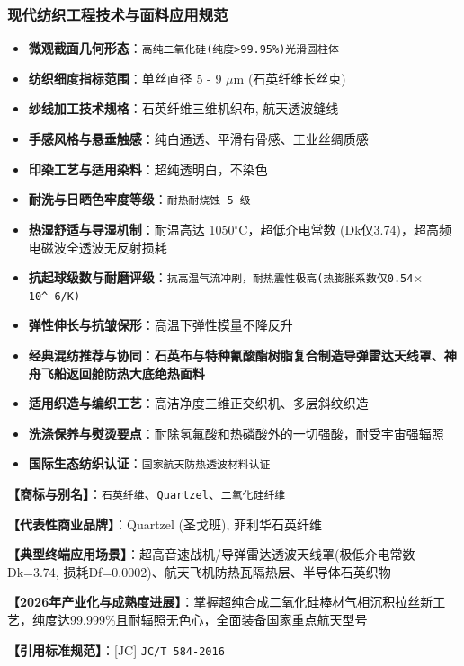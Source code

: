 \documentclass[11pt,openright,twoside,UTF8]{ctexbook}
\begin{document}
\subsubsection*{现代纺织工程技术与面料应用规范}
\begin{itemize} \setlength{\itemsep}{2pt}
    \item \textbf{微观截面几何形态}：\texttt{高纯二氧化硅(纯度\textgreater{}99.95\%)光滑圆柱体}
    \item \textbf{纺织细度指标范围}：单丝直径 5 - 9 $\mu$m (石英纤维长丝束)
    \item \textbf{纱线加工技术规格}：石英纤维三维机织布, 航天透波缝线
    \item \textbf{手感风格与悬垂触感}：纯白通透、平滑有骨感、工业丝绸质感
    \item \textbf{印染工艺与适用染料}：超纯透明白，不染色
    \item \textbf{耐洗与日晒色牢度等级}：\texttt{耐热耐烧蚀 5 级}
    \item \textbf{热湿舒适与导湿机制}：耐温高达 1050$^\circ\mathrm{C}$，超低介电常数 (Dk仅3.74)，超高频电磁波全透波无反射损耗
    \item \textbf{抗起球级数与耐磨评级}：\texttt{抗高温气流冲刷，耐热震性极高(热膨胀系数仅0.54$\times$10\textasciicircum{}-6/K)}
    \item \textbf{弹性伸长与抗皱保形}：高温下弹性模量不降反升
    \item \textbf{经典混纺推荐与协同}：\textbf{石英布与特种氰酸酯树脂复合制造导弹雷达天线罩、神舟飞船返回舱防热大底绝热面料}
    \item \textbf{适用织造与编织工艺}：高洁净度三维正交织机、多层斜纹织造
    \item \textbf{洗涤保养与熨烫要点}：耐除氢氟酸和热磷酸外的一切强酸，耐受宇宙强辐照
    \item \textbf{国际生态纺织认证}：\texttt{国家航天防热透波材料认证}
\end{itemize}
\vspace{0.2cm}

\noindent\textbf{【商标与别名】}：\texttt{石英纤维}、\texttt{Quartzel}、\texttt{二氧化硅纤维}\par
\noindent\textbf{【代表性商业品牌】}：Quartzel (圣戈班), 菲利华石英纤维\par
\noindent\textbf{【典型终端应用场景】}：超高音速战机/导弹雷达透波天线罩(极低介电常数Dk=3.74, 损耗Df=0.0002)、航天飞机防热瓦隔热层、半导体石英织物\par
\noindent\textbf{【2026年产业化与成熟度进展】}：掌握超纯合成二氧化硅棒材气相沉积拉丝新工艺，纯度达99.999\%且耐辐照无色心，全面装备国家重点航天型号\par
\noindent\textbf{【引用标准规范】}：[JC] \texttt{JC/T 584-2016}\par
\vspace{0.5cm}
\end{document}
